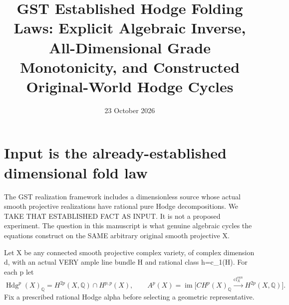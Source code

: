 \documentclass[11pt]{article}
\title{GST Established Hodge Folding Laws: Explicit Algebraic Inverse, All-Dimensional Grade Monotonicity, and Constructed Original-World Hodge Cycles}
\date{23 October 2026}
\begin{document}
\maketitle

\section{Input is the already-established dimensional fold law}
The GST realization framework includes a dimensionless source
whose actual smooth projective realizations have rational pure
Hodge decompositions. We TAKE THAT ESTABLISHED FACT AS INPUT.
It is not a proposed experiment. The question in this
manuscript is what genuine algebraic cycles the equations
construct on the SAME arbitrary original smooth projective X.

Let X be any connected smooth projective complex variety,
of complex dimension d, with an actual VERY ample line bundle
H and rational class h=c_1(H). For each p let
\[
 \operatorname{Hdg}^p(X)_{\mathbb Q}
 =H^{2p}(X,\mathbb Q)\cap H^{p,p}(X),\qquad
 A^p(X)=\operatorname{im}\bigl[
 CH^p(X)_{\mathbb Q}\xrightarrow{\mathrm{cl}^{can}_X}
 H^{2p}(X,\mathbb Q)\bigr].
\]
Fix a prescribed rational Hodge alpha before selecting a
geometric representative.
\end{document}
